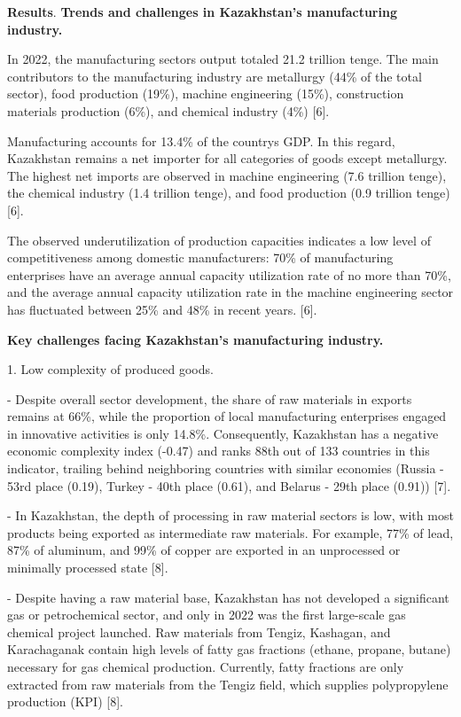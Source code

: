 {\bfseries Results}. {\bfseries Trends and challenges in Kazakhstan's
manufacturing industry.}

In 2022, the manufacturing sector\textquotesingle s output totaled 21.2
trillion tenge. The main contributors to the manufacturing industry are
metallurgy (44\% of the total sector), food production (19\%), machine
engineering (15\%), construction materials production (6\%), and
chemical industry (4\%) {[}6{]}.

Manufacturing accounts for 13.4\% of the country\textquotesingle s GDP.
In this regard, Kazakhstan remains a net importer for all categories of
goods except metallurgy. The highest net imports are observed in machine
engineering (7.6 trillion tenge), the chemical industry (1.4 trillion
tenge), and food production (0.9 trillion tenge) {[}6{]}.

The observed underutilization of production capacities indicates a low
level of competitiveness among domestic manufacturers: 70\% of
manufacturing enterprises have an average annual capacity utilization
rate of no more than 70\%, and the average annual capacity utilization
rate in the machine engineering sector has fluctuated between 25\% and
48\% in recent years. {[}6{]}.

{\bfseries Key challenges facing Kazakhstan's manufacturing industry.}

1. Low complexity of produced goods.

- Despite overall sector development, the share of raw materials in
exports remains at 66\%, while the proportion of local manufacturing
enterprises engaged in innovative activities is only 14.8\%.
Consequently, Kazakhstan has a negative economic complexity index
(-0.47) and ranks 88th out of 133 countries in this indicator, trailing
behind neighboring countries with similar economies (Russia - 53rd place
(0.19), Turkey - 40th place (0.61), and Belarus - 29th place (0.91))
{[}7{]}.

- In Kazakhstan, the depth of processing in raw material sectors is low,
with most products being exported as intermediate raw materials. For
example, 77\% of lead, 87\% of aluminum, and 99\% of copper are exported
in an unprocessed or minimally processed state {[}8{]}.

- Despite having a raw material base, Kazakhstan has not developed a
significant gas or petrochemical sector, and only in 2022 was the first
large-scale gas chemical project launched. Raw materials from Tengiz,
Kashagan, and Karachaganak contain high levels of fatty gas fractions
(ethane, propane, butane) necessary for gas chemical production.
Currently, fatty fractions are only extracted from raw materials from
the Tengiz field, which supplies polypropylene production (KPI) {[}8{]}.

